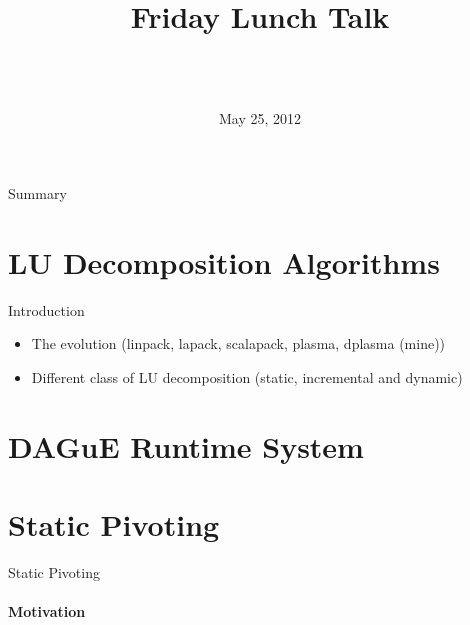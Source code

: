 \documentclass{beamer}
\title[LU Decompositions over DAGuE]{
        {\bfseries \projet\\} 
        {\bfseries \huge \sujet}
        {\small Friday Lunch Talk}
}
\date{May 25, 2012}
\author[Zenati]{
  {\normalsize \bfseries \sffamily} {\large \gA}\\
  \vspace{1cm}
  {\normalsize \bfseries \sffamily} {\large \gB}\\
}
\begin{document}
\begin{frame}
\maketitle
\end{frame}

\begin{frame}{Summary}
\tableofcontents
\end{frame}


\section{LU Decomposition Algorithms}
\begin{frame}{Introduction}
\begin{itemize}
\item The evolution (linpack, lapack, scalapack, plasma, dplasma (mine))
\item Different class of LU decomposition (static, incremental and dynamic)
\end{itemize}
\end{frame}

\section{DAGuE Runtime System}

\section{Static Pivoting}

\begin{frame}{Static Pivoting}
\framesubtitle{Motivation}
\end{frame}
\end{document}
